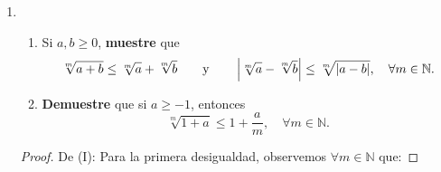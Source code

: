 \documentclass[12pt]{article}
\begin{document}
\begin{enumerate}
\begin{proof}
        De (II): Procedamos por inducción sobre $n$. El caso $n=2$ se probó en la parte (I). Suponga que el resultado se cumple para $n=k$. Probaremos que se cumple para $n=k+1$. En efecto, veamos que:
        \begin{equation*}
            \frac{\abs{a_1+\cdots+a_{k+1}}}{1+\abs{a_1+\cdots+a_{k+1}}}\leq\frac{\abs{a_1+\cdots+a_k}}{1+\abs{a_1+\cdots+a_k}}+\frac{\abs{a_{k+1}}}{1+\abs{a_{k+1}}}
        \end{equation*}
        aplicando el caso $n=2$ a $a_1+\cdots+a_{k}$ y $a_{k+1}$. Usando la hipótesis de inducción se tiene que:
        \begin{equation*}
            \begin{split}
                \frac{\abs{a_1+\cdots+a_{k+1}}}{1+\abs{a_1+\cdots+a_{k+1}}}\leq&\frac{\abs{a_1+\cdots+a_k}}{1+\abs{a_1+\cdots+a_k}}+\frac{\abs{a_{k+1}}}{1+\abs{a_{k+1}}}\\
                \leq&\frac{\abs{a_1}}{1+\abs{a_1}}+\cdots+\frac{\abs{a_k}}{1+\abs{a_k}}+\frac{\abs{a_{k+1}}}{1+\abs{a_{k+1}}}\\
                \Rightarrow\frac{\abs{a_1+\cdots+a_{k+1}}}{1+\abs{a_1+\cdots+a_{k+1}}}\leq&\frac{\abs{a_1}}{1+\abs{a_1}}+\cdots+\frac{\abs{a_{k+1}}}{1+\abs{a_{k+1}}}
            \end{split}
        \end{equation*}
        De esta forma, el resultado se cumple para $n=k+1$. Aplicando inducción, el resultado se cumple para toda $n\in\mathbb{N}$, $n\geq2$.
        \qed
    \end{proof}
    \item \begin{enumerate}
        \item Si $a,b\geq0$, \textbf{muestre} que
        \begin{equation*}
            \sqrt[m]{a+b}\leq\sqrt[m]{a}+\sqrt[m]{b} \qquad \textup{y} \qquad \left| \sqrt[m]{a}-\sqrt[m]{b} \right|\leq\sqrt[m]{\left| a-b \right|}, \quad \forall m\in\mathbb{N}.
        \end{equation*}
        \item \textbf{Demuestre} que si $a\geq-1$, entonces
        \begin{equation*}
            \sqrt[m]{1+a}\leq1+\frac{a}{m},\quad\forall m\in\mathbb{N}.
        \end{equation*}
    \end{enumerate}
    \begin{proof}
        De (I): Para la primera desigualdad, observemos $\forall m\in\mathbb{N}$ que:

\end{proof}
\end{enumerate}
\end{document}
